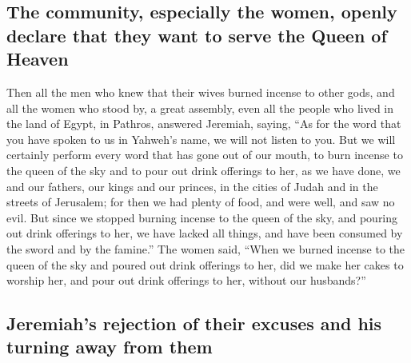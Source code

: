 \hypertarget{the-community-especially-the-women-openly-declare-that-they-want-to-serve-the-queen-of-heaven}{%
\subsection{The community, especially the women, openly declare that
they want to serve the Queen of
Heaven}\label{the-community-especially-the-women-openly-declare-that-they-want-to-serve-the-queen-of-heaven}}

 Then all the men who knew that their wives burned
incense to other gods, and all the women who stood by, a great assembly,
even all the people who lived in the land of Egypt, in Pathros, answered
Jeremiah, saying,  ``As for the word that you have spoken
to us in Yahweh's name, we will not listen to you.  But
we will certainly perform every word that has gone out of our mouth, to
burn incense to the queen of the sky and to pour out drink offerings to
her, as we have done, we and our fathers, our kings and our princes, in
the cities of Judah and in the streets of Jerusalem; for then we had
plenty of food, and were well, and saw no evil.  But
since we stopped burning incense to the queen of the sky, and pouring
out drink offerings to her, we have lacked all things, and have been
consumed by the sword and by the famine.''  The women
said, ``When we burned incense to the queen of the sky and poured out
drink offerings to her, did we make her cakes to worship her, and pour
out drink offerings to her, without our husbands?''

\hypertarget{jeremiahs-rejection-of-their-excuses-and-his-turning-away-from-them}{%
\subsection{Jeremiah's rejection of their excuses and his turning away
from
them}\label{jeremiahs-rejection-of-their-excuses-and-his-turning-away-from-them}}

